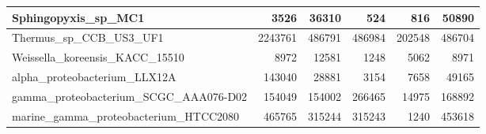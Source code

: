\documentclass[12pt,a4paper]{article}
\begin{document}
\begin{table}[ht]
\begin{center}
\begin{tabular}{|l*{5}{|r}|}
Sphingopyxis\_sp\_MC1 & 3526 & 36310 & 524 & 816 & 50890 \\ \hline
Thermus\_sp\_CCB\_US3\_UF1 & 2243761 & 486791 & 486984 & 202548 & 486704 \\ \hline
Weissella\_koreensis\_KACC\_15510 & 8972 & 12581 & 1248 & 5062 & 8971 \\ \hline
alpha\_proteobacterium\_LLX12A & 143040 & 28881 & 3154 & 7658 & 49165 \\ \hline
gamma\_proteobacterium\_SCGC\_AAA076-D02 & 154049 & 154002 & 266465 & 14975 & 168892 \\ \hline
marine\_gamma\_proteobacterium\_HTCC2080 & 465765 & 315244 & 315243 & 1240 & 453618 \\ \hline
\end{tabular}
\end{center}
\end{table}
\end{document}
